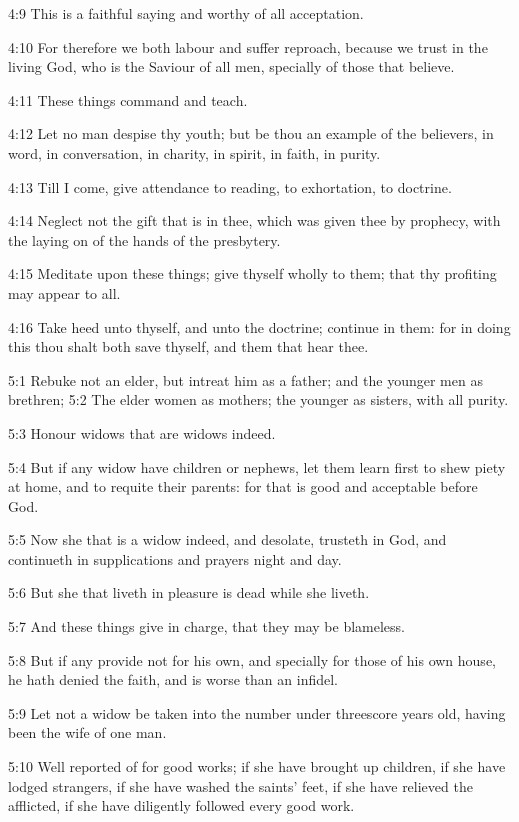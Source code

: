4:9 This is a faithful saying and worthy of all acceptation.

4:10 For therefore we both labour and suffer reproach, because we
trust in the living God, who is the Saviour of all men, specially of
those that believe.

4:11 These things command and teach.

4:12 Let no man despise thy youth; but be thou an example of the
believers, in word, in conversation, in charity, in spirit, in faith,
in purity.

4:13 Till I come, give attendance to reading, to exhortation, to
doctrine.

4:14 Neglect not the gift that is in thee, which was given thee by
prophecy, with the laying on of the hands of the presbytery.

4:15 Meditate upon these things; give thyself wholly to them; that thy
profiting may appear to all.

4:16 Take heed unto thyself, and unto the doctrine; continue in them:
for in doing this thou shalt both save thyself, and them that hear
thee.

5:1 Rebuke not an elder, but intreat him as a father; and the younger
men as brethren; 5:2 The elder women as mothers; the younger as
sisters, with all purity.

5:3 Honour widows that are widows indeed.

5:4 But if any widow have children or nephews, let them learn first to
shew piety at home, and to requite their parents: for that is good and
acceptable before God.

5:5 Now she that is a widow indeed, and desolate, trusteth in God, and
continueth in supplications and prayers night and day.

5:6 But she that liveth in pleasure is dead while she liveth.

5:7 And these things give in charge, that they may be blameless.

5:8 But if any provide not for his own, and specially for those of his
own house, he hath denied the faith, and is worse than an infidel.

5:9 Let not a widow be taken into the number under threescore years
old, having been the wife of one man.

5:10 Well reported of for good works; if she have brought up children,
if she have lodged strangers, if she have washed the saints' feet, if
she have relieved the afflicted, if she have diligently followed every
good work.

